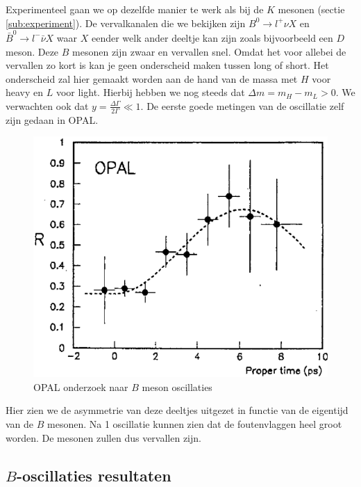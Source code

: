 \documentclass[../main.tex]{subfiles}
\begin{document}
Experimenteel  gaan we op dezelfde manier te werk als bij de $K$ mesonen (sectie \ref{sub:experiment}). De vervalkanalen die we bekijken zijn $B^{0} \rightarrow l^{+} \nu X$ en $\bar{B}^{0} \rightarrow l^{-} \bar{\nu} X$ waar $X$ eender welk ander deeltje kan zijn zoals bijvoorbeeld een $D$ meson. Deze $B$ mesonen zijn zwaar en vervallen snel. Omdat het voor allebei de vervallen zo kort is kan je geen onderscheid maken tussen long of short. Het onderscheid zal hier gemaakt worden aan de hand van de massa met $H$ voor heavy en $L$ voor light. Hierbij hebben we nog steeds dat $\Delta m = m_H - m_L > 0$. We verwachten ook dat $y = \frac{\Delta \Gamma}{2 \Gamma} \ll 1$. De eerste goede metingen van de oscillatie zelf zijn gedaan in OPAL.

\begin{figure}[h]
    \centering
    \includegraphics[width=0.6\linewidth]{meson_mixing_and_oscillations/b_osc_exp.png}
    \caption{OPAL onderzoek naar $B$ meson oscillaties}%
    \label{fig:meson_mixing_and_oscillations/b_osc_exp}
\end{figure}

Hier zien we de asymmetrie van deze deeltjes uitgezet in functie van de eigentijd van de $B$ mesonen. Na 1 oscillatie kunnen zien dat de foutenvlaggen heel groot worden. De mesonen zullen dus vervallen zijn.

\subsection{$B$-oscillaties resultaten}%
\label{sub:_b_oscillaties_resultaten}
\end{document}
